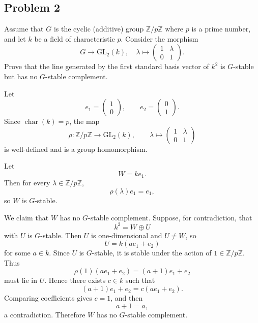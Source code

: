 \subsection*{Problem 2}
Assume that $G$ is the cyclic (additive) group $\mathbb{Z}/p\mathbb{Z}$ where $p$ is a prime number, and let $k$ be a field of characteristic $p$. 
Consider the morphism
$$
G \to \mathrm{GL}_2(k), \quad \lambda \mapsto \begin{pmatrix} 1 & \lambda \\ 0 & 1 \end{pmatrix}.
$$
Prove that the line generated by the first standard basis vector of $k^2$ is $G$-stable but has no $G$-stable complement.
\begin{solution}
    Let
\[
e_1=\begin{pmatrix}1\\0\end{pmatrix},
\qquad
e_2=\begin{pmatrix}0\\1\end{pmatrix}.
\]
Since \(\operatorname{char}(k)=p\), the map
\[
\rho:\mathbb Z/p\mathbb Z\to \mathrm{GL}_2(k),
\qquad
\lambda\mapsto
\begin{pmatrix}
1&\lambda\\
0&1
\end{pmatrix}
\]
is well-defined and is a group homomorphism.

Let
\[
W=ke_1.
\]
Then for every \(\lambda\in \mathbb Z/p\mathbb Z\),
\[
\rho(\lambda)e_1=e_1,
\]
so \(W\) is \(G\)-stable.

We claim that \(W\) has no \(G\)-stable complement. Suppose, for contradiction, that
\[
k^2=W\oplus U
\]
with \(U\) is \(G\)-stable. Then \(U\) is one-dimensional and \(U\neq W\), so
\[
U=k(ae_1+e_2)
\]
for some \(a\in k\). Since \(U\) is \(G\)-stable, it is stable under the action of \(1\in \mathbb Z/p\mathbb Z\). Thus
\[
\rho(1)(ae_1+e_2)=(a+1)e_1+e_2
\]
must lie in \(U\). Hence there exists \(c\in k\) such that
\[
(a+1)e_1+e_2=c(ae_1+e_2).
\]
Comparing coefficients gives \(c=1\), and then
\[
a+1=a,
\]
a contradiction. Therefore \(W\) has no \(G\)-stable complement.
\end{solution}



